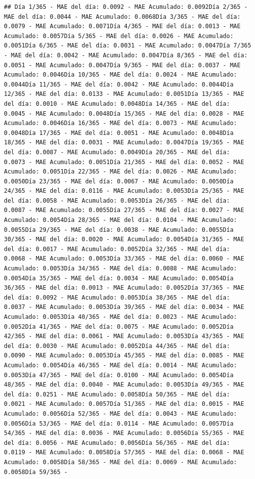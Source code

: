 \documentclass[
]{book}
\begin{document}
\begin{verbatim}
## Día 1/365 - MAE del día: 0.0092 - MAE Acumulado: 0.0092Día 2/365 - MAE del día: 0.0044 - MAE Acumulado: 0.0068Día 3/365 - MAE del día: 0.0079 - MAE Acumulado: 0.0071Día 4/365 - MAE del día: 0.0013 - MAE Acumulado: 0.0057Día 5/365 - MAE del día: 0.0026 - MAE Acumulado: 0.0051Día 6/365 - MAE del día: 0.0031 - MAE Acumulado: 0.0047Día 7/365 - MAE del día: 0.0042 - MAE Acumulado: 0.0047Día 8/365 - MAE del día: 0.0051 - MAE Acumulado: 0.0047Día 9/365 - MAE del día: 0.0037 - MAE Acumulado: 0.0046Día 10/365 - MAE del día: 0.0024 - MAE Acumulado: 0.0044Día 11/365 - MAE del día: 0.0042 - MAE Acumulado: 0.0044Día 12/365 - MAE del día: 0.0133 - MAE Acumulado: 0.0051Día 13/365 - MAE del día: 0.0010 - MAE Acumulado: 0.0048Día 14/365 - MAE del día: 0.0045 - MAE Acumulado: 0.0048Día 15/365 - MAE del día: 0.0028 - MAE Acumulado: 0.0046Día 16/365 - MAE del día: 0.0073 - MAE Acumulado: 0.0048Día 17/365 - MAE del día: 0.0051 - MAE Acumulado: 0.0048Día 18/365 - MAE del día: 0.0031 - MAE Acumulado: 0.0047Día 19/365 - MAE del día: 0.0087 - MAE Acumulado: 0.0049Día 20/365 - MAE del día: 0.0073 - MAE Acumulado: 0.0051Día 21/365 - MAE del día: 0.0052 - MAE Acumulado: 0.0051Día 22/365 - MAE del día: 0.0026 - MAE Acumulado: 0.0050Día 23/365 - MAE del día: 0.0067 - MAE Acumulado: 0.0050Día 24/365 - MAE del día: 0.0116 - MAE Acumulado: 0.0053Día 25/365 - MAE del día: 0.0058 - MAE Acumulado: 0.0053Día 26/365 - MAE del día: 0.0087 - MAE Acumulado: 0.0055Día 27/365 - MAE del día: 0.0027 - MAE Acumulado: 0.0054Día 28/365 - MAE del día: 0.0104 - MAE Acumulado: 0.0055Día 29/365 - MAE del día: 0.0038 - MAE Acumulado: 0.0055Día 30/365 - MAE del día: 0.0020 - MAE Acumulado: 0.0054Día 31/365 - MAE del día: 0.0017 - MAE Acumulado: 0.0052Día 32/365 - MAE del día: 0.0068 - MAE Acumulado: 0.0053Día 33/365 - MAE del día: 0.0060 - MAE Acumulado: 0.0053Día 34/365 - MAE del día: 0.0088 - MAE Acumulado: 0.0054Día 35/365 - MAE del día: 0.0034 - MAE Acumulado: 0.0054Día 36/365 - MAE del día: 0.0013 - MAE Acumulado: 0.0052Día 37/365 - MAE del día: 0.0092 - MAE Acumulado: 0.0053Día 38/365 - MAE del día: 0.0037 - MAE Acumulado: 0.0053Día 39/365 - MAE del día: 0.0034 - MAE Acumulado: 0.0053Día 40/365 - MAE del día: 0.0023 - MAE Acumulado: 0.0052Día 41/365 - MAE del día: 0.0075 - MAE Acumulado: 0.0052Día 42/365 - MAE del día: 0.0061 - MAE Acumulado: 0.0053Día 43/365 - MAE del día: 0.0030 - MAE Acumulado: 0.0052Día 44/365 - MAE del día: 0.0090 - MAE Acumulado: 0.0053Día 45/365 - MAE del día: 0.0085 - MAE Acumulado: 0.0054Día 46/365 - MAE del día: 0.0014 - MAE Acumulado: 0.0053Día 47/365 - MAE del día: 0.0100 - MAE Acumulado: 0.0054Día 48/365 - MAE del día: 0.0040 - MAE Acumulado: 0.0053Día 49/365 - MAE del día: 0.0251 - MAE Acumulado: 0.0058Día 50/365 - MAE del día: 0.0021 - MAE Acumulado: 0.0057Día 51/365 - MAE del día: 0.0015 - MAE Acumulado: 0.0056Día 52/365 - MAE del día: 0.0043 - MAE Acumulado: 0.0056Día 53/365 - MAE del día: 0.0114 - MAE Acumulado: 0.0057Día 54/365 - MAE del día: 0.0036 - MAE Acumulado: 0.0056Día 55/365 - MAE del día: 0.0056 - MAE Acumulado: 0.0056Día 56/365 - MAE del día: 0.0119 - MAE Acumulado: 0.0058Día 57/365 - MAE del día: 0.0068 - MAE Acumulado: 0.0058Día 58/365 - MAE del día: 0.0069 - MAE Acumulado: 0.0058Día 59/365 - 
\end{verbatim}
\end{document}
